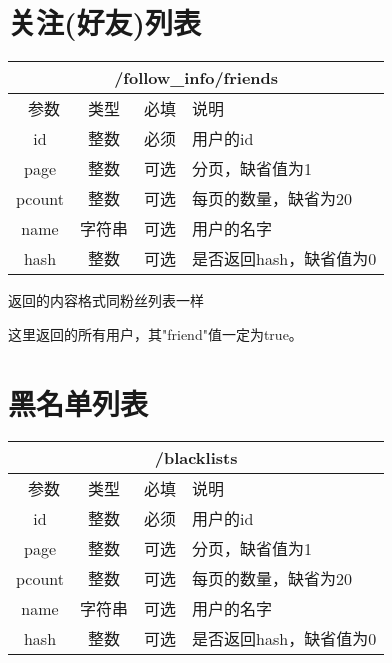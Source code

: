 \documentclass[cs4size]{ctexartutf8}
\begin{document}
\section{关注(好友)列表}

\begin{table}[H]
   \begin{center}
\begin{tabular}{|c|c|c|p{12cm}|}
\hline
\multicolumn{4}{|c|}{/follow\_info/friends} \\
\hline\hline
 \  参数  & 类型 & 必填 &  说明  \\
\hline
 id  & 整数 & 必须 &  用户的id\\
   \hline
 page  & 整数 & 可选 & 分页，缺省值为1\\ 
 \hline
 pcount  & 整数 & 可选 & 每页的数量，缺省为20\\ 
     \hline
 name  & 字符串 & 可选 & 用户的名字\\ 
     \hline
 hash  & 整数 & 可选 & 是否返回hash，缺省值为0\\ 
\hline

\end{tabular}
   \end{center}
\end{table}

返回的内容格式同粉丝列表一样

这里返回的所有用户，其"friend"值一定为true。


\section{黑名单列表}

\begin{table}[H]
   \begin{center}
\begin{tabular}{|c|c|c|p{12cm}|}
\hline
\multicolumn{4}{|c|}{/blacklists} \\
\hline\hline
 \  参数  & 类型 & 必填 &  说明  \\
\hline
 id  & 整数 & 必须 &  用户的id\\
   \hline
 page  & 整数 & 可选 & 分页，缺省值为1\\ 
 \hline
 pcount  & 整数 & 可选 & 每页的数量，缺省为20\\ 
     \hline
 name  & 字符串 & 可选 & 用户的名字\\ 
     \hline
 hash  & 整数 & 可选 & 是否返回hash，缺省值为0\\ 
\hline
\end{tabular}
   \end{center}
\end{table}
\end{document}
